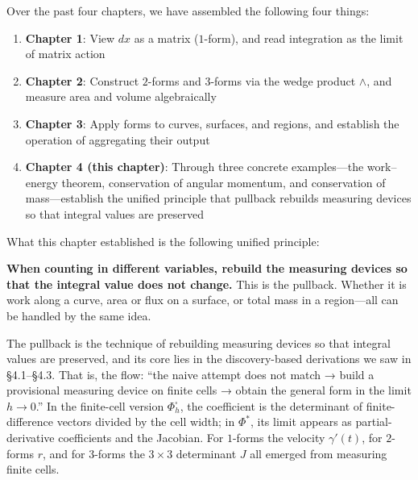 Over the past four chapters, we have assembled the following four
things:

\begin{enumerate}
\def\labelenumi{\arabic{enumi}.}
\tightlist
\item
  \textbf{Chapter 1}: View \(dx\) as a matrix (\(1\)-form), and read
  integration as the limit of matrix action
\item
  \textbf{Chapter 2}: Construct \(2\)-forms and \(3\)-forms via the
  wedge product \(\wedge\), and measure area and volume algebraically
\item
  \textbf{Chapter 3}: Apply forms to curves, surfaces, and regions, and
  establish the operation of aggregating their output
\item
  \textbf{Chapter 4 (this chapter)}: Through three concrete
  examples---the work--energy theorem, conservation of angular momentum,
  and conservation of mass---establish the unified principle that
  pullback rebuilds measuring devices so that integral values are
  preserved
\end{enumerate}

What this chapter established is the following unified principle:

\textbf{When counting in different variables, rebuild the measuring devices so that the integral value does not change.}
This is the pullback. Whether it is work along a curve, area or flux on
a surface, or total mass in a region---all can be handled by the same
idea.

The pullback is the technique of rebuilding measuring devices so that
integral values are preserved, and its core lies in the discovery-based
derivations we saw in §4.1--§4.3. That is, the flow: ``the naive attempt
does not match → build a provisional measuring device on finite cells →
obtain the general form in the limit \(h\to0\).'' In the finite-cell
version \(\Phi_h^\square\), the coefficient is the determinant of
finite-difference vectors divided by the cell width; in \(\Phi^*\), its
limit appears as partial-derivative coefficients and the Jacobian. For
\(1\)-forms the velocity \(\gamma'(t)\), for \(2\)-forms \(r\), and for
\(3\)-forms the \(3\times3\) determinant \(J\) all emerged from
measuring finite cells.

